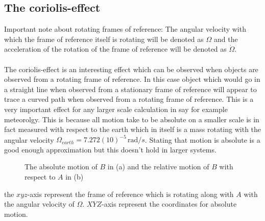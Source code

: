 \documentclass[11pt, a4paper]{article}
\newcommand*{\rad}{\ensuremath{\,\text{rad}}}
\begin{document}
\subsection{The coriolis-effect}
Important note about rotating frames of reference: The angular velocity with which the frame of reference itself is rotating will be denoted as $\Omega$ and the acceleration of the rotation of the frame of reference will be denoted as $\dot{\Omega}$.\\
\\
The coriolis-effect is an interesting effect which can be observed when objects are observed from a rotating frame of reference. In this case object which would go in a straight line when observed from a stationary frame of reference will appear to trace a curved path when observed from a rotating frame of reference. This is a very important effect for any larger scale calculation in say for example meteorolgy. This is because all motion take to be absolute on a smaller scale is in fact measured with respect to the earth which in itself is a mass rotating with the angular velocity $\Omega_{earth} = 7.272(10)^{-5} \rad/s$. Stating that motion is absolute is a good enough approximation but this doesn't hold in larger systems.
\begin{figure}[h]
  \centering
  \qquad \qquad \qquad
  \caption{The absolute motion of $B$ in (a) and the relative motion of $B$ with respect to $A$ in (b)}
\end{figure}
the $xyz$-axis represent the frame of reference which is rotating along with $A$ with the angular velocity of $\Omega$. $XYZ$-axis represent the coordinates for absolute motion.\\
\end{document}
